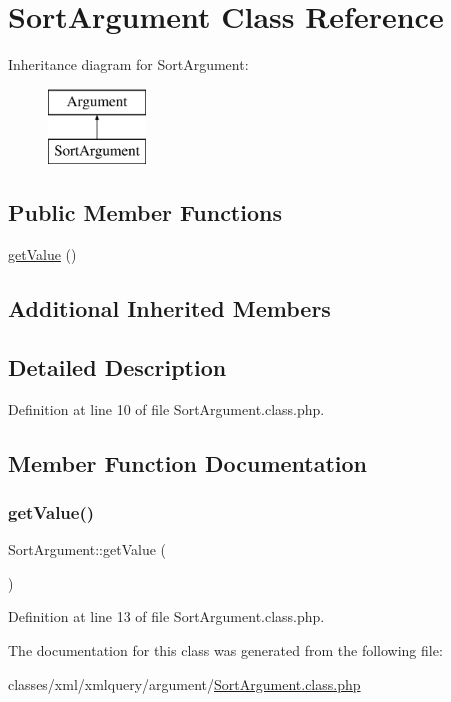 \hypertarget{classSortArgument}{}\section{Sort\+Argument Class Reference}
\label{classSortArgument}
Inheritance diagram for Sort\+Argument\+:\begin{figure}[H]
\begin{center}
\leavevmode
\includegraphics[height=2.000000cm]{classSortArgument}
\end{center}
\end{figure}
\subsection*{Public Member Functions}
\begin{DoxyCompactItemize}
\item 
\hyperlink{classSortArgument_a8894d7257159d72f72bbf0732df72385}{get\+Value} ()
\end{DoxyCompactItemize}
\subsection*{Additional Inherited Members}


\subsection{Detailed Description}


Definition at line 10 of file Sort\+Argument.\+class.\+php.



\subsection{Member Function Documentation}
\hypertarget{classSortArgument_a8894d7257159d72f72bbf0732df72385}{}\label{classSortArgument_a8894d7257159d72f72bbf0732df72385} 
\subsubsection{\texorpdfstring{get\+Value()}{getValue()}}
{\footnotesize\ttfamily Sort\+Argument\+::get\+Value (\begin{DoxyParamCaption}{ }\end{DoxyParamCaption})}



Definition at line 13 of file Sort\+Argument.\+class.\+php.



The documentation for this class was generated from the following file\+:\begin{DoxyCompactItemize}
\item 
classes/xml/xmlquery/argument/\hyperlink{SortArgument_8class_8php}{Sort\+Argument.\+class.\+php}\end{DoxyCompactItemize}
